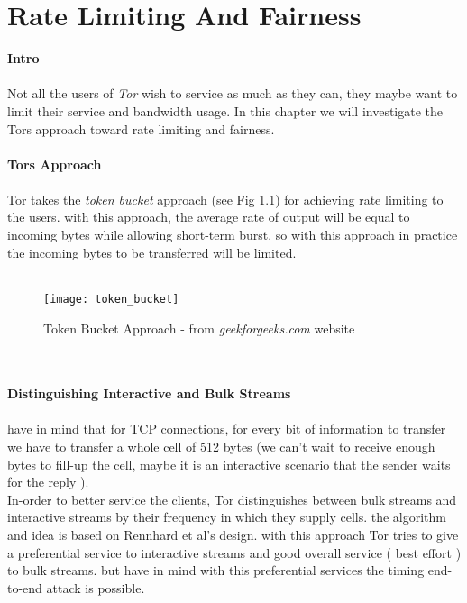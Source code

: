 \chapter{Rate Limiting And Fairness}
\textbf{Intro}
\\\\
Not all the users of \textit{Tor} wish to service as much as they can, they maybe want to limit their service and bandwidth usage. In this chapter we will investigate the Tors approach toward rate limiting and fairness.\\\\
\textbf{Tors Approach}\\
\\
Tor takes the \textit{token bucket} approach (see Fig \ref{fig:Token_bucket}) for achieving rate limiting to the users. with this approach, the average rate of output will be equal to incoming bytes while allowing short-term burst. so with this approach in practice the incoming bytes to be transferred will be limited.\\
\\
\begin{figure}[!h]
\centering\texttt{[image: token\_bucket]}
\caption{Token Bucket Approach - from \textit{geekforgeeks.com} website}
\label{fig:Token_bucket} %
\end{figure}
\\
\\
\textbf{Distinguishing Interactive and Bulk Streams }\\
\\
have in mind that for TCP connections, for every bit of information to transfer we have to transfer a whole cell of 512 bytes (we can't wait to receive enough bytes to fill-up the cell, maybe it is an interactive scenario that the sender waits for the reply ).\\
In-order to better service the clients, Tor distinguishes between bulk streams and interactive streams by their frequency in which they supply cells. the algorithm and idea is based on Rennhard et al’s design. with this approach Tor tries to give a preferential service to interactive streams and good overall service ( best effort ) to bulk streams. but have in mind with this preferential services the timing end-to-end attack is possible.\\

